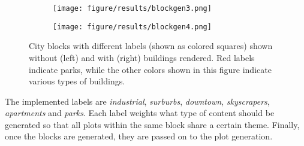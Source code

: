 \begin{figure}[h!]
  \centering
  \begin{subfigure}[b]{0.469\textwidth}
    \texttt{[image: figure/results/blockgen3.png]}
  \end{subfigure}
  \quad
  \begin{subfigure}[b]{0.471\textwidth}
    \texttt{[image: figure/results/blockgen4.png]}
  \end{subfigure}

  \caption{City blocks with different labels (shown as colored squares) shown without (left) and with (right) buildings rendered. Red labels indicate parks, while the other colors shown in this figure indicate various types of buildings.}
  \label{fig:results_blockgen3}
\end{figure}

The implemented labels are \textit{industrial}, \textit{surburbs}, \textit{downtown}, \textit{skyscrapers}, \textit{apartments} and \textit{parks}.
Each label weights what type of content should be generated so that all plots within the same block share a certain theme.
Finally, once the blocks are generated, they are passed on to the plot generation.